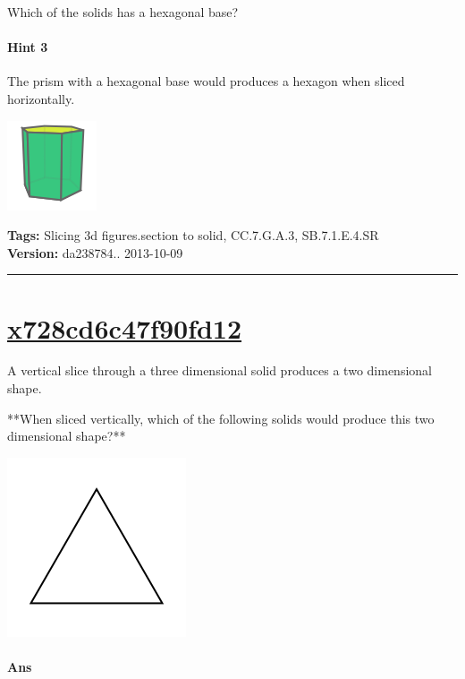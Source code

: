 \documentclass[twocolumn,10pt]{article}
\def\shrinkfactor{0.4}
\begin{document}
Which of the solids has a hexagonal base?

\paragraph{Hint 3}The prism with a hexagonal base would produces a hexagon when sliced horizontally.


\includegraphics[scale=\shrinkfactor]{figures/994232bee673b9d41efe1aa168ac2544d5531e55.png}



\medskip
\noindent
\textbf{Tags:} {\footnotesize Slicing 3d figures.section to solid, CC.7.G.A.3, SB.7.1.E.4.SR}\\
\textbf{Version:} da238784.. 2013-10-09
\smallskip\hrule





\section{\href{https://www.khanacademy.org/devadmin/content/items/x728cd6c47f90fd12}{x728cd6c47f90fd12}}

\noindent
A vertical slice through a three dimensional solid produces a two dimensional shape.

**When sliced vertically, which of the following solids would produce this two dimensional shape?**   

\includegraphics[scale=\shrinkfactor]{figures/820f1a9b52329001eaf7845a5d6661adb18f27b8.png} 


\paragraph{Ans} 
\end{document}
